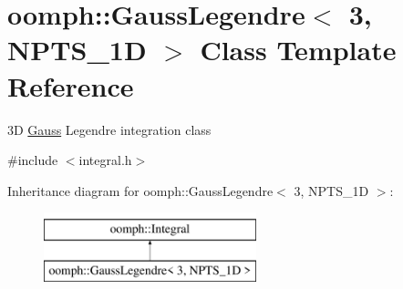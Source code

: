 \hypertarget{classoomph_1_1GaussLegendre_3_013_00_01NPTS__1D_01_4}{}\section{oomph\+:\+:Gauss\+Legendre$<$ 3, N\+P\+T\+S\+\_\+1D $>$ Class Template Reference}
\label{classoomph_1_1GaussLegendre_3_013_00_01NPTS__1D_01_4}


3D \hyperlink{classoomph_1_1Gauss}{Gauss} Legendre integration class  




{\ttfamily \#include $<$integral.\+h$>$}

Inheritance diagram for oomph\+:\+:Gauss\+Legendre$<$ 3, N\+P\+T\+S\+\_\+1D $>$\+:\begin{figure}[H]
\begin{center}
\leavevmode
\includegraphics[height=2.000000cm]{classoomph_1_1GaussLegendre_3_013_00_01NPTS__1D_01_4}
\end{center}
\end{figure}
